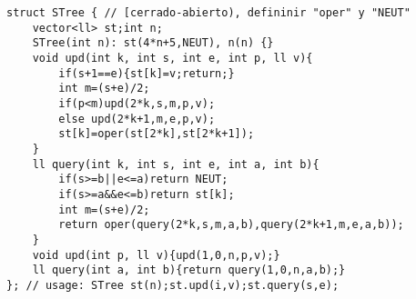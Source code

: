 \begin{verbatim}
struct STree { // [cerrado-abierto), defininir "oper" y "NEUT"
    vector<ll> st;int n;
    STree(int n): st(4*n+5,NEUT), n(n) {}
    void upd(int k, int s, int e, int p, ll v){
        if(s+1==e){st[k]=v;return;}
        int m=(s+e)/2;
        if(p<m)upd(2*k,s,m,p,v);
        else upd(2*k+1,m,e,p,v);
        st[k]=oper(st[2*k],st[2*k+1]);
    }
    ll query(int k, int s, int e, int a, int b){
        if(s>=b||e<=a)return NEUT;
        if(s>=a&&e<=b)return st[k];
        int m=(s+e)/2;
        return oper(query(2*k,s,m,a,b),query(2*k+1,m,e,a,b));
    }
    void upd(int p, ll v){upd(1,0,n,p,v);}
    ll query(int a, int b){return query(1,0,n,a,b);}
}; // usage: STree st(n);st.upd(i,v);st.query(s,e);
\end{verbatim}